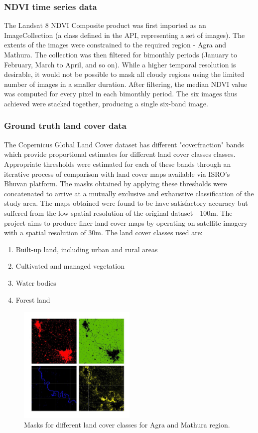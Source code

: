 \documentclass[12pt, a4paper]{report}
\begin{document}
\subsubsection{NDVI time series data}
The Landsat 8 NDVI Composite product was first imported as an ImageCollection (a class defined in the API, representing a set of images). The extents of the images were constrained to the required region - Agra and Mathura. The collection was then filtered for bimonthly periods (January to February, March to April, and so on). While a higher temporal resolution is desirable, it would not be possible to mask all cloudy regions using the limited number of images in a smaller duration. After filtering, the median NDVI value was computed for every pixel in each bimonthly period. The six images thus achieved were stacked together, producing a single six-band image.
\subsubsection{Ground truth land cover data}
The Copernicus Global Land Cover dataset has different "coverfraction" bands which provide proportional estimates for different land cover classes classes. Appropriate thresholds were estimated for each of these bands through an iterative process of comparison with land cover maps available via ISRO's Bhuvan platform. The masks obtained by applying these thresholds were concatenated to arrive at a mutually exclusive and exhaustive classification of the study area. The maps obtained were found to be have satisfactory accuracy but suffered from the low spatial resolution of the original dataset - 100m. The project aims to produce finer land cover maps by operating on satellite imagery with a spatial resolution of 30m.
The land cover classes used are:
\begin{enumerate}
\item Built-up land, including urban and rural areas
\item Cultivated and managed vegetation
\item Water bodies
\item Forest land
\end{enumerate}
\begin{figure}[h]
\centering
\includegraphics[width=0.5\textwidth]{lcbands.jpg}
\caption{Masks for different land cover classes for Agra and Mathura region.}
\end{figure}
\end{document}
